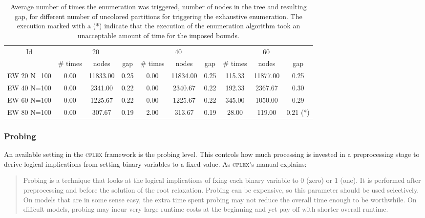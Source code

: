 \begin{sidewaystable}[h]
\label{table:bnc:prune}
\centering

\begin{tabular}{|c|ccc|ccc|ccc|}
\hline
\multicolumn{1}{|c|}{Id} & \multicolumn{3}{|c|}{20} & \multicolumn{3}{|c|}{40} & \multicolumn{3}{|c|}{60}
\\
 & \# times & nodes & gap & \# times & nodes & gap & \# times & nodes & gap
\\
\hline
EW 20 N=100 & 0.00 & 11833.00 & 0.25 & 0.00 & 11834.00 & 0.25 & 115.33 & 11877.00 & 0.25
\\
EW 40 N=100 & 0.00 & 2341.00 & 0.22 & 0.00 & 2340.67 & 0.22 & 192.33 & 2367.67 & 0.30
\\
EW 60 N=100 & 0.00 & 1225.67 & 0.22 & 0.00 & 1225.67 & 0.22 & 345.00 & 1050.00 & 0.29
\\
EW 80 N=100 & 0.00 & 307.67 & 0.19 & 2.00 & 313.67 & 0.19 & 28.00 & 119.00 & 0.21 (*)
\\
\hline 
 \end{tabular}

\caption{Average number of times the enumeration was triggered, number of nodes in the tree and resulting gap, for different number of uncolored partitions for triggering the exhaustive enumeration. The execution marked with a (*) indicate that the execution of the enumeration algorithm took an unacceptable amount of time for the imposed bounds.}

\end{sidewaystable}

\subsubsection{Probing}

An available setting in the \textsc{cplex} framework is the probing level. This controls how much processing is invested in a preprocessing stage to derive logical implications from setting binary variables to a fixed value. As \textsc{cplex}'s manual \cite{cplex121} explains:

\begin{quote}

Probing is a technique that looks at the logical implications of fxing each binary variable to 0 (zero) or 1 (one). It is performed after preprocessing and before the solution of the root relaxation. Probing can be expensive, so this parameter should be used selectively. On models that are in some sense easy, the extra time spent probing may not reduce the overall time enough to be worthwhile. On diffcult models, probing may incur very large runtime costs at the beginning and yet pay off with shorter overall runtime. 

\end{quote}


